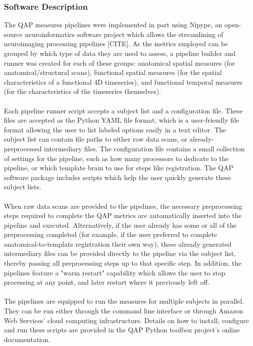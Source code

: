 \documentclass{frontiersSCNS} %
\begin{document}
\subsubsection{Software Description}
\label{sec:20}
The QAP measures pipelines were implemented in part using Nipype, an open-source neuroinformatics software project which allows the streamlining of neuroimaging processing pipelines [CITE]. As the metrics employed can be grouped by which type of data they are used to assess, a pipeline builder and runner was created for each of these groups: anatomical spatial measures (for anatomical/structural scans), functional spatial measures (for the spatial characteristics of a functional 4D timeseries), and functional temporal measures (for the characteristics of the timeseries themselves).
\\\\
Each pipeline runner script accepts a subject list and a configuration file. These files are accepted as the Python YAML file format, which is a user-friendly file format allowing the user to list labeled options easily in a text editor. The subject list can contain file paths to either raw data scans, or already-preprocessed intermediary files. The configuration file contains a small collection of settings for the pipeline, such as how many processors to dedicate to the pipeline, or which template brain to use for steps like registration. The QAP software package includes scripts which help the user quickly generate these subject lists.
\\\\
When raw data scans are provided to the pipelines, the necessary preprocessing steps required to complete the QAP metrics are automatically inserted into the pipeline and executed. Alternatively, if the user already has some or all of the preprocessing completed (for example, if the user preferred to complete anatomical-to-template registration their own way), these already generated intermediary files can be provided directly to the pipeline via the subject list, thereby passing all preprocessing steps up to that specific step. In addition, the pipelines feature a "warm restart" capability which allows the user to stop processing at any point, and later restart where it previously left off.
\\\\
The pipelines are equipped to run the measures for multiple subjects in parallel. They can be run either through the command line interface or through Amazon Web Services' cloud computing infrastructure. Details on how to install, configure and run these scripts are provided in the QAP Python toolbox project’s online documentation.
\end{document}
